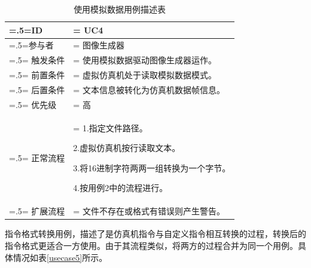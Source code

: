 \begin{table}[htbp]
    \begin{center}
        \caption{使用模拟数据用例描述表}
        \label{usecase4}
        \renewcommand\arraystretch{1.5}
        \begin{tabularx}{0.8\textwidth}{ 
            | >{\centering\arraybackslash\hsize=.5\hsize\linewidth=\hsize}X 
            | >{\raggedright\arraybackslash\hsize=1.5\hsize\linewidth=\hsize}X 
            | }
            \hline
            \textbf{ID} & \textbf{UC4}\\
            \hline
            参与者 & 图像生成器\\
            \hline
            触发条件 & 使用模拟数据驱动图像生成器运作。\\
            \hline
            前置条件 & 虚拟仿真机处于读取模拟数据模式。\\
            \hline
            后置条件 & 文本信息被转化为仿真机数据帧信息。\\
            \hline
            优先级 & 高\\
            \hline
            正常流程 & 1.指定文件路径。\par 2.虚拟仿真机按行读取文本。\par 3.将16进制字符两两一组转换为一个字节。\par 4.按用例2中的流程进行。\\
            \hline
            扩展流程 & 文件不存在或格式有错误则产生警告。\\
            \hline
        \end{tabularx}
    \end{center}
\end{table}
\par
指令格式转换用例，描述了是仿真机指令与自定义指令相互转换的过程，转换后的指令格式更适合一方使用。由于其流程类似，将两方的过程合并为同一个用例。具体情况如表\ref{usecase5}所示。
